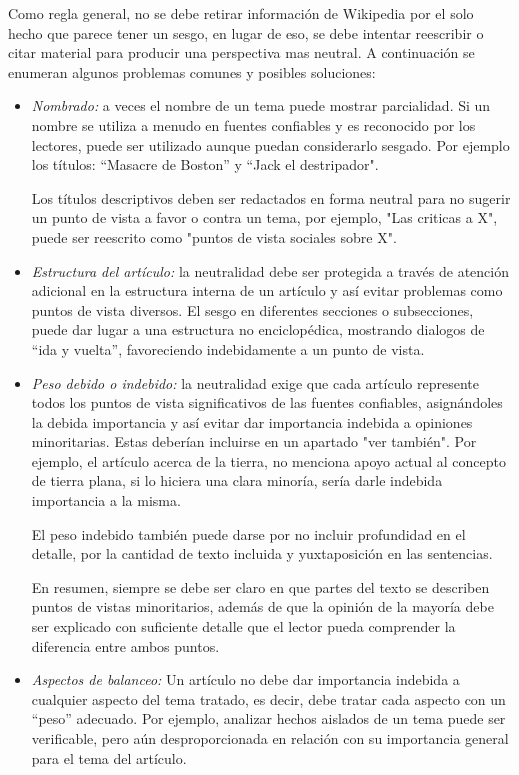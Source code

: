 \begin{itemize}
Como regla general, no se debe retirar informaci\'on de Wikipedia por el solo hecho que parece tener un sesgo, en lugar de eso, se debe intentar reescribir o citar material para producir una perspectiva mas neutral.
A continuaci\'on se enumeran algunos problemas comunes y posibles soluciones:

\begin{itemize}
\item \emph{Nombrado:} a veces el nombre de un tema puede mostrar parcialidad. Si un nombre se utiliza a menudo en fuentes confiables y es reconocido por los lectores, puede ser utilizado aunque puedan considerarlo sesgado. Por ejemplo los t\'itulos: ``Masacre de Boston'' y ``Jack el destripador".

Los t\'itulos descriptivos deben ser redactados en forma neutral para no sugerir un punto de vista a favor o contra un tema, por ejemplo, "Las criticas a X", puede ser reescrito como "puntos de vista sociales sobre X".

\item \emph{Estructura del art\'iculo:} la neutralidad debe ser protegida a trav\'es de atenci\'on adicional en la estructura interna de un art\'iculo y as\'i evitar problemas como puntos de vista diversos. El sesgo en diferentes secciones o subsecciones, puede dar lugar a una estructura no enciclop\'edica, mostrando dialogos de ``ida y vuelta'', favoreciendo indebidamente a un punto de vista.

\item \emph{Peso debido o indebido:} la neutralidad exige que cada art\'iculo represente todos los puntos de vista significativos de las fuentes confiables, asign\'andoles la debida importancia y as\'i evitar dar importancia indebida a opiniones minoritarias. Estas deber\'ian incluirse en un apartado "ver tambi\'en". Por ejemplo, el art\'iculo acerca de la tierra, no menciona apoyo actual al concepto de tierra plana, si lo hiciera una clara minor\'ia, ser\'ia darle indebida importancia a la misma.

El peso indebido tambi\'en puede darse por no incluir profundidad en el detalle, por la cantidad de texto incluida y yuxtaposici\'on en las sentencias.

En resumen, siempre se debe ser claro en que partes del texto se describen puntos de vistas minoritarios, adem\'as de que la opini\'on de la mayor\'ia debe ser explicado con suficiente detalle que el lector pueda comprender la diferencia entre ambos puntos.

\item \emph{Aspectos de balanceo:} Un art\'iculo no debe dar importancia indebida a cualquier aspecto del tema tratado, es decir, debe tratar cada aspecto con un ``peso'' adecuado. Por ejemplo, analizar hechos aislados de un tema puede ser verificable, pero a\'un desproporcionada en relaci\'on con su importancia general para el tema del art\'iculo.


\end{itemize}
\end{itemize}
